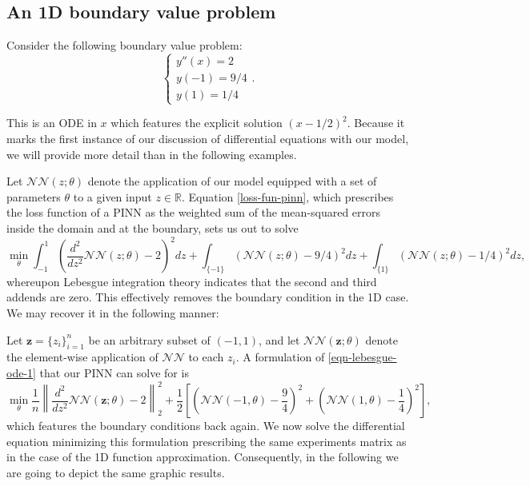 \documentclass[12pt]{report} %
\newcommand{\tmmathbf}[1]{\ensuremath{\boldsymbol{#1}}}
\begin{document}
\subsection*{An 1D boundary value problem}

Consider the following boundary value problem:
\[ \left\{\begin{array}{l}
    y'' (x) = 2 \\
    y (-1) =9/4 \\ 
    y (1) = 1 / 4
  \end{array}\right. . \]

This is an ODE in $x$ which features the explicit solution $(x - 1 / 2)^2$.
Because it marks the first instance of our discussion of differential equations
with our model, we will provide more detail than in the following examples.

Let $\mathcal{N}\mathcal{N} (z ; \theta)$ denote the application of our
model equipped with a set of parameters $\theta$ to a given input $z \in
  \mathbb{R}$. Equation \eqref{loss-fun-pinn}, which prescribes the loss function
of a PINN as the weighted sum of the mean-squared errors inside the domain and at
the boundary, sets us out to solve
\begin{equation}
  \min_{\theta}  \int_{-1}^1 \left( \frac{d^2}{d z^2} \mathcal{N}\mathcal{N} (z ;
    \theta) - 2 \right)^2 d z + \int_{\{ -1 \}} (\mathcal{N}\mathcal{N} (z ;
  \theta) - 9 / 4)^2 d z + \int_{\{ 1 \}} (\mathcal{N}\mathcal{N} (z ;
  \theta) - 1 / 4)^2 d z, \label{eqn-lebesgue-ode-1}
\end{equation}
whereupon Lebesgue integration theory indicates that the second and third addends are zero.
This effectively removes the boundary condition in the 1D case. We may
recover it in the following manner:

Let $\tmmathbf{z}= \{ z_i \}_{i = 1}^n$ be an arbitrary subset of $(-1, 1)$,
and let $\mathcal{N}\mathcal{N} (\tmmathbf{z}; \theta)$ denote the
element-wise application of $\mathcal{N}\mathcal{N}$ to each $z_i$. A
formulation of \eqref{eqn-lebesgue-ode-1} that our PINN can solve for is
\[ \min_{\theta}  \frac{1}{n} \left\| \frac{d^2}{d z^2} \mathcal{N}\mathcal{N}
  (\tmmathbf{z}; \theta) - 2 \right\|_2^2 
  + \frac{1}{2} \left[ \left(
  \mathcal{N}\mathcal{N} (-1, \theta) - \frac{9}{4} \right)^2 + \left(
  \mathcal{N}\mathcal{N} (1, \theta) - \frac{1}{4} \right)^2 \right], \]
which features the boundary conditions back again. We now solve the
differential equation minimizing this formulation prescribing the same experiments matrix as in the case of the 1D function approximation. Consequently, in the following we are going to depict the same graphic results.
\end{document}
